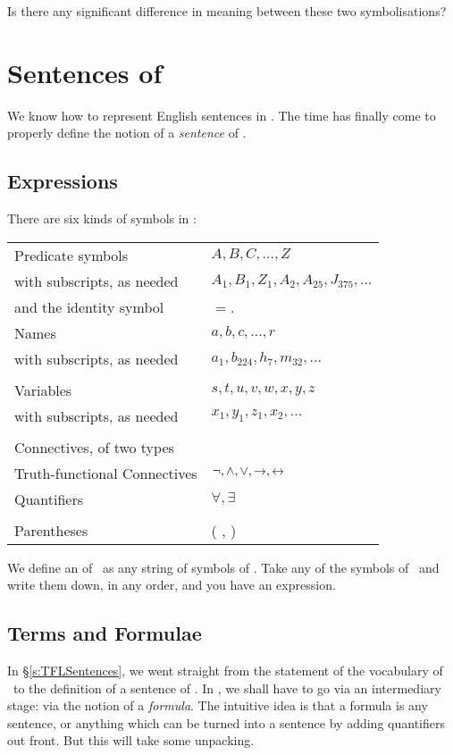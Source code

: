  Is there any significant difference in meaning between these two symbolisations?  






\chapter{Sentences of \textnormal{\FOL}}\label{s:FOLSentences}
We know how to represent English sentences in \FOL. The time has finally come to properly define the notion of a \emph{sentence} of \FOL.

\section{Expressions}
There are six kinds of symbols in \FOL:

\begin{center}
\begin{tabular}{l l} \toprule 
Predicate symbols & $A,B,C,…,Z$\\
with subscripts, as needed & $A_{1}, B_{1},Z_{1},A_{2},A_{25},J_{375},…$\\
and the identity symbol &  $=$.
\\
Names & $a,b,c,…, r$\\
with subscripts, as needed & $a_{1}, b_{224}, h_7, m_{32},…$\\
\\
Variables & $s, t, u, v, w, x,y,z$\\
with subscripts, as needed & $x_{1}, y_{1}, z_{1}, x_{2},…$\\
\\
Connectives, of two types & \\
Truth-functional Connectives & $\neg,\wedge,\vee,\rightarrow,\leftrightarrow$\\
Quantifiers & $\forall, \exists$\\
\\
Parentheses &( , )\\
\bottomrule \end{tabular}
\end{center}
We define an  of \FOL\ as any string of symbols of \FOL. Take any of the symbols of \FOL\ and write them down, in any order, and you have an expression.

\section{Terms and Formulae}\label{s:termsandf}
In §\ref{s:TFLSentences}, we went straight from the statement of the vocabulary of \TFL\ to the definition of a sentence of \TFL. In \FOL, we shall have to go via an intermediary stage: via the notion of a \emph{formula}. The intuitive idea is that a formula is any sentence, or anything which can be turned into a sentence by adding quantifiers out front. But this will take some unpacking.

